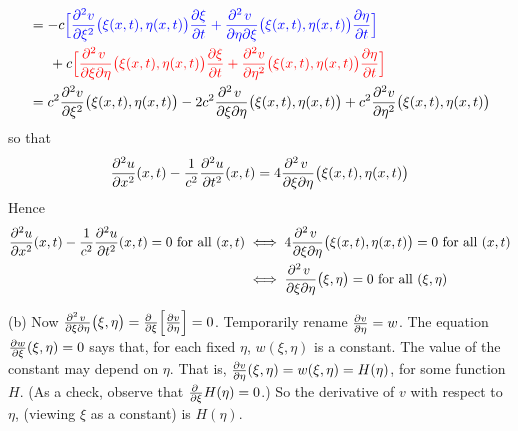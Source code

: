 \begin{solution}
\begin{align*}
&=-c\textcolor{blue}{\Big[\frac{\partial^2 v}{\partial \xi^2}
                                     \big(\xi(x,t),\eta(x,t)\big)
                                                      \pdiff{\xi}{t}
+\frac{\partial^2\hfil v\hfil\,}{\partial\eta\partial \xi}
                                      \big(\xi(x,t),\eta(x,t)\big)
                               \pdiff{\eta}{t}\Big]} \\&\hskip0.2in
+c\textcolor{red}{\Big[\frac{\partial^2\hfil v\hfil\,}{\partial\xi\partial\eta}
                    \big(\xi(x,t),\eta(x,t)\big)
                   \pdiff{\xi}{t}
+\frac{\partial^2 v}{\partial\eta^2}\big(\xi(x,t),\eta(x,t)\big)
   \pdiff{\eta}{t}\Big]}\\
&=c^2\frac{\partial^2 v}{\partial \xi^2}\big(\xi(x,t),\eta(x,t)\big)
-2c^2\frac{\partial^2\hfil v\hfil\,}{\partial\xi\partial\eta}
                                        \big(\xi(x,t),\eta(x,t)\big)
+c^2\frac{\partial^2 v}{\partial\eta^2}\big(\xi(x,t),\eta(x,t)\big)
\end{align*}
so that 
\begin{equation*}
\frac{\partial^2 u}{\partial x^2}(x,t)
-\frac{1}{c^2}\frac{\partial^2 u}{\partial t^2}(x,t)
=4\frac{\partial^2\hfil v\hfil\,}{\partial\xi\partial\eta}
      \big(\xi(x,t),\eta(x,t)\big)
\end{equation*}
Hence
\begin{align*}
\frac{\partial^2 u}{\partial x^2}(x,t)
-\frac{1}{c^2}\frac{\partial^2 u}{\partial t^2}(x,t)=0
\text{ for all }(x,t)
&\iff
4\frac{\partial^2\hfil v\hfil\,}{\partial\xi\partial\eta}
      \big(\xi(x,t),\eta(x,t)\big)=0\hbox{ for all }(x,t)\\
&\iff
\frac{\partial^2\hfil v\hfil\,}{\partial\xi\partial\eta}
      \big(\xi,\eta\big)=0\text{ for all }(\xi,\eta)
\end{align*}

(b)
Now $\frac{\partial^2\hfil v\hfil\,}{\partial\xi\partial\eta}\big(\xi,\eta\big)
=\frac{\partial\hfill}{\partial\xi}
\Big[\frac{\partial v}{\partial\eta}\Big]=0$.
Temporarily rename $\pdiff{v}{\eta}=w$. The equation
$\pdiff{w}{\xi}(\xi,\eta)=0$ says that, for each fixed
$\eta$, $w(\xi,\eta)$ is a constant. The value of the constant may depend
on $\eta$. That is, $\pdiff{v}{\eta}(\xi,\eta)=w(\xi,\eta)
=H(\eta)$, for some function $H$. (As a check, observe that
$\pdiff{}{\xi}H(\eta)=0$.) 
So the derivative of $v$ with respect to $\eta$,
(viewing $\xi$ as a constant) is $H(\eta)$. 


\end{solution}
